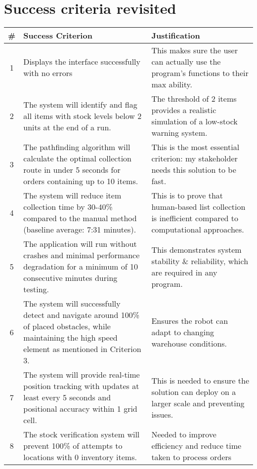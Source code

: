 \newpage

\section{Success criteria revisited}

\begin{table}[htbp!]
	\centering
	\begin{tabularx}{\textwidth}{|c|X|X|}
		\hline
		\textbf{\#} & \textbf{Success Criterion} & \textbf{Justification} \\
		\hline
		1 & Displays the interface successfully with no errors & This makes sure the user can actually use the program's functions to their max ability. \\
		\hline
		2 & The system will identify and flag all items with stock levels below 2 units at the end of a run. & The threshold of 2 items provides a realistic simulation of a low-stock warning system. \\
		\hline
		3 & The pathfinding algorithm will calculate the optimal collection route in under 5 seconds for orders containing up to 10 items. & This is the most essential criterion: my stakeholder needs this solution to be fast. \\
		\hline
		4 & The system will reduce item collection time by 30-40\% compared to the manual method (baseline average: 7:31 minutes). & This is to prove that human-based list collection is inefficient compared to computational approaches. \\
		\hline
		5 & The application will run without crashes and minimal performance degradation for a minimum of 10 consecutive minutes during testing. & This demonstrates system stability \& reliability, which are required in any program. \\
		\hline
		6 & The system will successfully detect and navigate around 100\% of placed obstacles, while maintaining the high speed element as mentioned in Criterion 3. & Ensures the robot can adapt to changing warehouse conditions. \\
		\hline
		7 & The system will provide real-time position tracking with updates at least every 5 seconds and positional accuracy within 1 grid cell. & This is needed to ensure the solution can deploy on a larger scale and preventing issues. \\
		\hline
		8 & The stock verification system will prevent 100\% of attempts to locations with 0 inventory items. & Needed to improve efficiency and reduce time taken to process orders \\

\end{tabularx}
\end{table}
